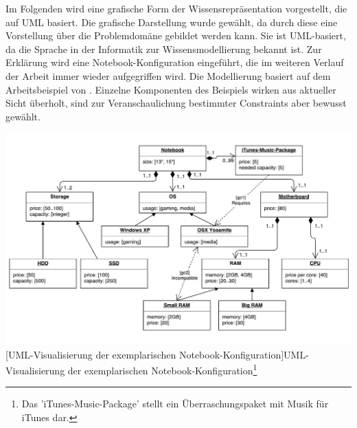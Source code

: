 \documentclass[11pt, a4paper, titlepage, listof=totoc, bibliography=totoc, index=totoc, twoside, openright, headings=normal]{scrreprt}
\begin{document}
Im Folgenden wird eine grafische Form der Wissensrepräsentation vorgestellt, die auf UML basiert. Die grafische Darstellung wurde gewählt, da durch diese eine Vorstellung über die Problemdomäne gebildet werden kann. Sie ist UML-basiert, da die Sprache in der Informatik zur Wissensmodellierung bekannt ist. Zur Erklärung wird eine Notebook-Konfiguration eingeführt, die im weiteren Verlauf der Arbeit immer wieder aufgegriffen wird. Die Modellierung basiert auf dem Arbeitsbeispiel von \citep{felferning14}. Einzelne Komponenten des Beispiels wirken aus aktueller Sicht überholt, sind zur Veranschaulichung bestimmter Constraints aber bewusst gewählt.

\vspace{1em}
\begin{minipage}{\linewidth}
	\centering
	\includegraphics[width=1\linewidth]{Abbildungen/notebookConfigurationUML.pdf}
	[UML-Visualisierung der exemplarischen Notebook-Konfiguration]{UML-Visualisierung der exemplarischen Notebook-Konfiguration\footnote{Das 'iTunes-Music-Package' stellt ein Überraschungspaket mit Musik für iTunes dar.}}
	\label{fig:notebookConfigurationUML}
\end{minipage}
\vspace{1em}
\end{document}
